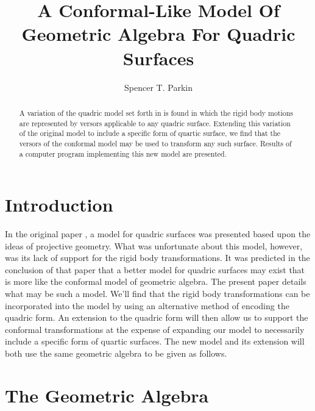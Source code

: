 \documentclass{birkjour}
\theoremstyle{definition}
\theoremstyle{remark}
\numberwithin{equation}{section}
\begin{document}
\title{A Conformal-Like Model Of Geometric Algebra For Quadric Surfaces}

\author{Spencer T. Parkin}





\begin{abstract}
A variation of the quadric model set forth in \cite{Parkin12} is
found in which the rigid body motions are represented by
versors applicable to any quadric surface.
Extending this variation of the original model to include
a specific form of quartic surface, we find that the versors of
the conformal model may be used to transform any such surface.
Results of a computer program implementing this new model are presented.
\end{abstract}

\maketitle

\section{Introduction}

In the original paper \cite{Parkin12}, a model for quadric surfaces was
presented based upon the ideas of projective geometry.  What was unfortunate
about this model, however, was its lack of support for the rigid body transformations.  It was
predicted in the conclusion of that paper that a better model for quadric
surfaces may exist that is more like the conformal model of geometric algebra.
The present paper details what may be such a model.  We'll find that the rigid
body transformations can be incorporated into the model by using an alternative
method of encoding the quadric form.  An extension to the quadric form
will then allow us to support the conformal transformations at the expense of
expanding our model to necessarily include a specific form of quartic surfaces.  The
new model and its extension will both use the same geometric algebra to be given as follows.

\section{The Geometric Algebra}
\end{document}
